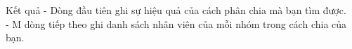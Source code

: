 Kết quả
- Dòng đầu tiên ghi sự hiệu quả của cách phân chia mà bạn tìm được.   
\\   - M dòng tiếp theo ghi danh sách nhân viên của mỗi nhóm trong cách chia của bạn.